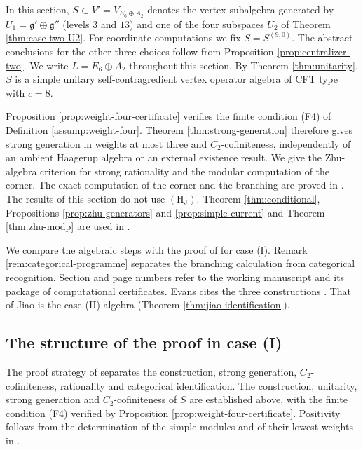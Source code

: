 \documentclass[leqno]{article}
\numberwithin{equation}{section}
\begin{document}
In this section, $S \subset V' = V_{E_6 \oplus A_2}$ denotes the vertex subalgebra generated by $U_1 = \mathfrak g' \oplus \mathfrak g''$ (levels $3$ and $13$) and one of the four subspaces $U_2$ of Theorem \ref{thm:case-two-U2}. For coordinate computations we fix $S = S^{(9,0)}$. The abstract conclusions for the other three choices follow from Proposition \ref{prop:centralizer-two}. We write $L = E_6 \oplus A_2$ throughout this section. By Theorem \ref{thm:unitarity}, $S$ is a simple unitary self-contragredient vertex operator algebra of CFT type with $c = 8$.

Proposition \ref{prop:weight-four-certificate} verifies the finite condition \textup{(F4)} of Definition \ref{assump:weight-four}. Theorem \ref{thm:strong-generation} therefore gives strong generation in weights at most three and $C_2$-cofiniteness, independently of an ambient Haagerup algebra or an external existence result. We give the Zhu-algebra criterion for strong rationality and the modular computation of the corner. The exact computation of the corner and the branching are proved in \cite[Appendix A]{ArhIII}. The results of this section do not use $\mathrm{(H_J)}$. Theorem \ref{thm:conditional}, Propositions \ref{prop:zhu-generators} and \ref{prop:simple-current} and Theorem \ref{thm:zhu-modp} are used in \cite[Appendix A]{ArhIII}.

We compare the algebraic steps with the proof of \cite{Rie26b} for case (I). Remark \ref{rem:categorical-programme} separates the branching calculation from categorical recognition. Section and page numbers refer to the working manuscript \cite{Rie26b} and its package of computational certificates. Evans \cite[p.~3]{Eva26} cites the three constructions \cite{Hua26,Jia26,Rie26}. That of Jiao is the case (II) algebra (Theorem \ref{thm:jiao-identification}).

\subsection{The structure of the proof in case (I)}
\label{subsec:riesen-structure}

The proof strategy of \cite{Rie26b} separates the construction, strong generation, $C_2$-cofiniteness, rationality and categorical identification. The construction, unitarity, strong generation and $C_2$-cofiniteness of $S$ are established above, with the finite condition \textup{(F4)} verified by Proposition \ref{prop:weight-four-certificate}. Positivity follows from the determination of the simple modules and of their lowest weights in \cite[Theorem 2.2(F1)--(F2)]{ArhIII}.
\end{document}
